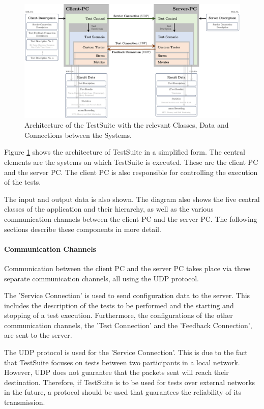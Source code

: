 \begin{figure}
    \centering
    \includegraphics[width=1\linewidth]{figures/method/swdesign2.pdf}
    \caption[Architecture of the TestSuite with the relevant Classes, Data and Connections between the Systems]{Architecture of the TestSuite with the relevant Classes, Data and Connections between the Systems.}
    \label{fig:tsarch}
\end{figure}

Figure \ref{fig:tsarch} shows the architecture of TestSuite in a simplified form. The central elements are the systems on which TestSuite is executed. These are the client PC and the server PC. The client PC is also responsible for controlling the execution of the tests.

The input and output data is also shown. The diagram also shows the five central classes of the application and their hierarchy, as well as the various communication channels between the client PC and the server PC. The following sections describe these components in more detail.

\paragraph{Communication Channels}
Communication between the client PC and the server PC takes place via three separate communication channels, all using the UDP protocol.

The 'Service Connection' is used to send configuration data to the server. This includes the description of the tests to be performed and the starting and stopping of a test execution. Furthermore, the configurations of the other communication channels, the 'Test Connection' and the 'Feedback Connection', are sent to the server.

The UDP protocol is used for the 'Service Connection'. This is due to the fact that TestSuite focuses on tests between two participants in a local network. However, UDP does not guarantee that the packets sent will reach their destination. Therefore, if TestSuite is to be used for tests over external networks in the future, a protocol should be used that guarantees the reliability of its transmission.

